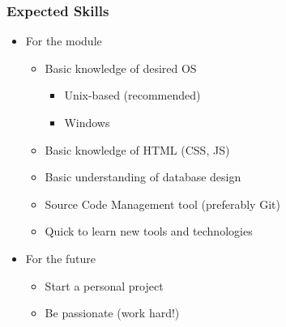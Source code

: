 \documentclass{beamer}
\begin{document}
\begin{frame}\frametitle{Expected Skills} 

  \begin{itemize}
  
    \item For the module
    \begin{itemize}
      \item Basic knowledge of desired OS
      \begin{itemize}
        \item Unix-based (recommended)
        \item Windows    \pause
      \end{itemize}

      \item Basic knowledge of HTML (CSS, JS)   \pause

      \item Basic understanding of database design  \pause
    
      \item Source Code Management tool (preferably Git)  \pause
    
      \item Quick to learn new tools and technologies  \pause
    
    \end{itemize}
    
    \item For the future
    \begin{itemize}
      \item Start a personal project   \pause
      \item Be passionate \pause (work hard!)
    \end{itemize}        
     
  \end{itemize}
\end{frame}
\end{document}
